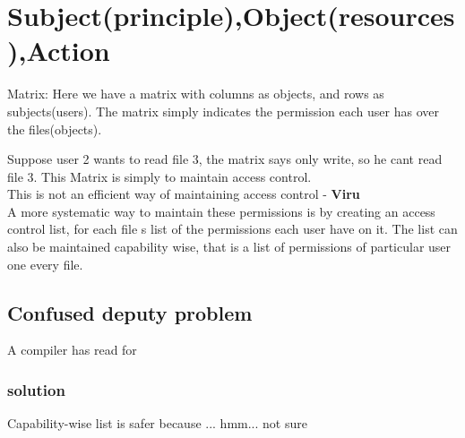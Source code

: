 \documentclass[english, 11pt]{article}
\begin{document}
\section*{Subject(principle),Object(resources),Action}

Matrix:
Here we have a matrix with columns as objects, and rows as subjects(users). The matrix simply indicates the permission each user has over the files(objects).


Suppose user 2 wants to read file 3, the matrix says only write, so he cant read file 3. This Matrix is simply to maintain access control. \\ 
This is not an efficient way of maintaining access control - \textbf{Viru} \\

A more systematic way to maintain these permissions is by creating an access control list, for each file s list of the permissions each user have on it.
The list can also be maintained capability wise, that is a list of permissions of particular user one every file. \\

\subsection*{Confused deputy problem}
A compiler has read for

\subsubsection*{solution}
Capability-wise list is safer because ... hmm... not sure 
\end{document}
